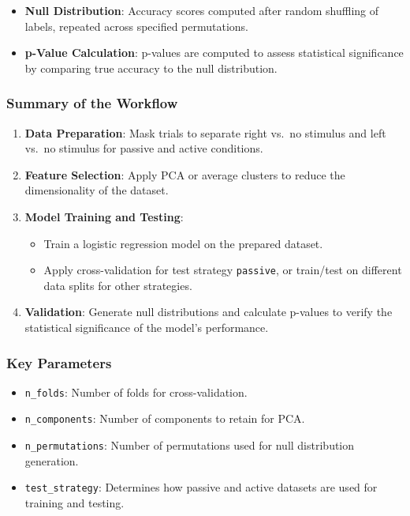 \documentclass[
  letterpaper,
  DIV=11,
  numbers=noendperiod]{scrartcl}
\providecommand{\tightlist}{%
  \setlength{\itemsep}{0pt}\setlength{\parskip}{0pt}}\usepackage{longtable,booktabs,array}
\begin{document}
\begin{enumerate}
  \begin{itemize}
  \tightlist
  \item
    \textbf{Null Distribution}: Accuracy scores computed after random
    shuffling of labels, repeated across specified permutations.
  \item
    \textbf{p-Value Calculation}: p-values are computed to assess
    statistical significance by comparing true accuracy to the null
    distribution.
  \end{itemize}
\end{enumerate}

\subsubsection{Summary of the Workflow}\label{summary-of-the-workflow}

\begin{enumerate}
\def\labelenumi{\arabic{enumi}.}
\tightlist
\item
  \textbf{Data Preparation}: Mask trials to separate right vs.~no
  stimulus and left vs.~no stimulus for passive and active conditions.
\item
  \textbf{Feature Selection}: Apply PCA or average clusters to reduce
  the dimensionality of the dataset.
\item
  \textbf{Model Training and Testing}:

  \begin{itemize}
  \tightlist
  \item
    Train a logistic regression model on the prepared dataset.
  \item
    Apply cross-validation for test strategy
    \texttt{\textquotesingle{}passive\textquotesingle{}}, or train/test
    on different data splits for other strategies.
  \end{itemize}
\item
  \textbf{Validation}: Generate null distributions and calculate
  p-values to verify the statistical significance of the model's
  performance.
\end{enumerate}

\subsubsection{Key Parameters}\label{key-parameters}

\begin{itemize}
\tightlist
\item
  \texttt{n\_folds}: Number of folds for cross-validation.
\item
  \texttt{n\_components}: Number of components to retain for PCA.
\item
  \texttt{n\_permutations}: Number of permutations used for null
  distribution generation.
\item
  \texttt{test\_strategy}: Determines how passive and active datasets
  are used for training and testing.
\end{itemize}
\end{document}
